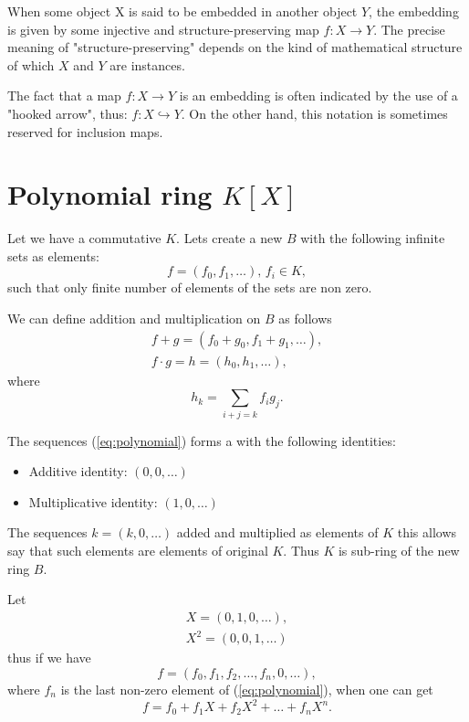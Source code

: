 \begin{definition}[Embedding]
  When some object X is said to be embedded in another object $Y$, the
  embedding is given by some injective and structure-preserving map
  $f : X \to Y$. The precise meaning of "structure-preserving" depends on
  the kind of mathematical structure of which $X$ and $Y$ are
  instances.
  
  The fact that a map $f : X \to Y$ is an embedding is often indicated
  by the use of a "hooked arrow", thus: $f:X\hookrightarrow Y$. On the
  other hand, this notation is sometimes reserved for inclusion maps.
  \label{def:embedding}
\end{definition}

\section{Polynomial ring $K\left[X\right]$}

Let we have a commutative  $K$. Lets create a new
 $B$ with the following infinite sets as elements:
\begin{equation}
  f = \left(f_0, f_1, \dots \right), \, f_i \in K,
  \label{eq:polynomial}
\end{equation}
such that only finite number of elements of the sets are non zero.

We can define addition and multiplication on $B$ as follows
\begin{eqnarray}
  f + g = \left(f_0 + g_0, f_1 + g_1, \dots \right),
  \nonumber \\
  f \cdot g = h = \left(h_0, h_1, \dots \right),
  \label{eq:polynomialops}
\end{eqnarray}
where
\[
h_k = \sum_{i + j =k} f_i g_j. 
\]

The sequences (\ref{eq:polynomial}) forms a  with
the following identities:
\begin{itemize}
\item Additive identity: $\left(0, 0, \dots \right)$
\item Multiplicative identity: $\left(1, 0, \dots \right)$
\end{itemize}

The
sequences $k = \left(k, 0, \dots \right)$ added and multiplied as
elements of $K$ this allows say that such elements are elements of
original  $K$. Thus $K$ is sub-ring of the new ring
$B$.

Let
\begin{eqnarray}
  X = \left(0, 1, 0, \dots \right),
  \nonumber \\
  X^2 = \left(0, 0, 1, \dots \right)
  \nonumber
\end{eqnarray}
thus if we have
\[
f = \left(f_0, f_1, f_2, \dots, f_n, 0, \dots \right),
\]
where $f_n$ is the last non-zero element of (\ref{eq:polynomial}),
when one can get
\[
f = f_0 + f_1 X + f_2 X^2 + \dots + f_n X^n.
\]

